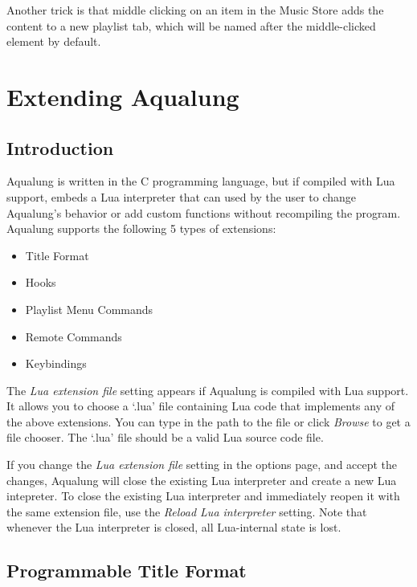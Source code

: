 \documentclass[10pt,english]{article}
\begin{document}
Another trick is that middle clicking on an item in the
Music Store adds the content to a new playlist tab, which will
be named after the middle-clicked element by default.






\section{Extending Aqualung\label{idp1962496}}

\subsection{Introduction\label{idp1963024}}



\noindent Aqualung is written in the C programming language, but if
compiled with Lua support, embeds a Lua interpreter that can
used by the user to change Aqualung's behavior or add custom
functions without recompiling the program. Aqualung supports
the following 5 types of extensions:


\begin{itemize}
\item Title Format
\item Hooks
\item Playlist Menu Commands
\item Remote Commands
\item Keybindings
\end{itemize}



\noindent The \textsl{Lua extension file} setting appears if
Aqualung is compiled with Lua support. It allows you to
choose a `.lua' file containing Lua code that implements
any of the above extensions.  You can type in the path to the file or click
\textsl{Browse} to get a file chooser. The `.lua'
file should be a valid Lua source code file.




If you change the \textsl{Lua extension file} setting in
the options page, and accept the changes, Aqualung will close
the existing Lua interpreter and create a new Lua intepreter.
To close the existing Lua interpreter and immediately reopen
it with the same extension file, use the \textsl{Reload Lua interpreter}
setting.  Note that whenever the Lua interpreter is closed,
all Lua-internal state is lost.




\subsection{Programmable Title Format\label{idp1970960}}
\end{document}
